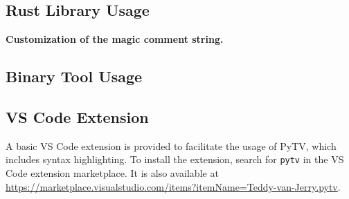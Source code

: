 \subsection{Rust Library Usage}

\textbf{Customization of the magic comment string.}

\subsection{Binary Tool Usage}

\subsection{VS Code Extension}
A basic VS Code extension is provided to facilitate the usage of PyTV,
which includes syntax highlighting.
To install the extension, search for \texttt{pytv} in the VS Code extension marketplace.
It is also available at \url{https://marketplace.visualstudio.com/items?itemName=Teddy-van-Jerry.pytv}.
